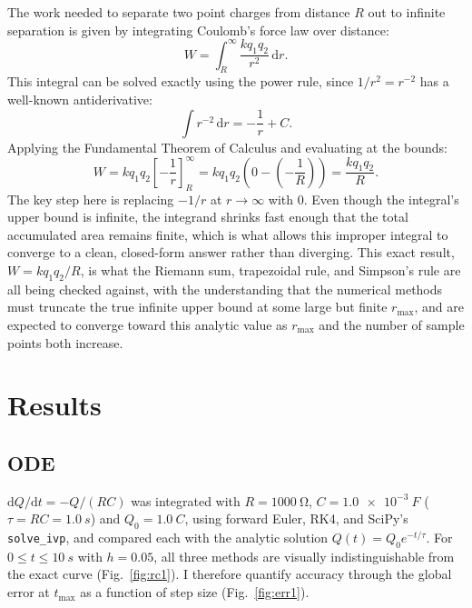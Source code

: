 \documentclass[11pt]{article}
\newcommand{\dd}{\mathrm{d}}
\newcommand{\rmax}{r_{\max}}
\begin{document}
The work needed to separate two point charges from distance $R$ out to infinite separation is given by integrating Coulomb's force law over distance:
\begin{equation}
  W = \int_R^{\infty} \frac{k q_1 q_2}{r^2}\,\dd r.
\end{equation}
This integral can be solved exactly using the power rule, since $1/r^2 = r^{-2}$ has a well-known antiderivative:
\begin{equation}
  \int r^{-2}\,\dd r = -\frac{1}{r} + C.
\end{equation}
Applying the Fundamental Theorem of Calculus and evaluating at the bounds:
\begin{equation}
  W = kq_1q_2\left[-\frac{1}{r}\right]_R^{\infty} = kq_1q_2\left(0 - \left(-\frac{1}{R}\right)\right) = \frac{kq_1q_2}{R}.
\end{equation}
The key step here is replacing $-1/r$ at $r \to \infty$ with $0$. Even though the integral's upper bound is infinite, the integrand shrinks fast enough that the total accumulated area remains finite, which is what allows this improper integral to converge to a clean, closed-form answer rather than diverging. This exact result, $W = kq_1q_2/R$, is what the Riemann sum, trapezoidal rule, and Simpson's rule are all being checked against, with the understanding that the numerical methods must truncate the true infinite upper bound at some large but finite $\rmax$, and are expected to converge toward this analytic value as $\rmax$ and the number of sample points both increase.

\section{Results}

\subsection{ODE}

$\dd Q/\dd t = -Q/(RC)$ was integrated with $R = \SI{1000}{\ohm}$, $C = \SI{1.0e-3}{F}$ ($\tau = RC = \SI{1.0}{s}$) and $Q_0 = \SI{1.0}{C}$, using forward Euler, RK4, and SciPy's \texttt{solve\_ivp}, and compared each with the analytic solution $Q(t) = Q_0 e^{-t/\tau}$. For $0 \le t \le \SI{10}{s}$ with $h = 0.05$, all three methods are visually indistinguishable from the exact curve (Fig.~\ref{fig:rc1}). I therefore quantify accuracy through the global error at $t_{\max}$ as a function of step size (Fig.~\ref{fig:err1}).
\end{document}
